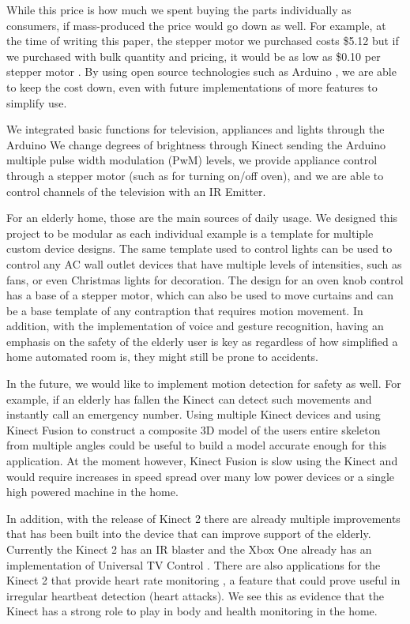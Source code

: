 \documentclass{chi-ext}
\begin{document}
While this price is how much we spent buying the parts individually as consumers, if mass-produced the price would go down as well.
For example, at the time of writing this paper, the stepper motor we purchased costs \$5.12 but if we purchased with bulk quantity and pricing, it would be as low as \$0.10 per stepper motor \cite{_stepper_motor}.
By using open source technologies such as Arduino \cite{_arduino_policy}, we are able to keep the cost down, even with future implementations of more features to simplify use.
 
We integrated basic functions for television, appliances and lights through the Arduino
We change degrees of brightness through Kinect sending the Arduino multiple pulse width modulation (PwM) levels, we provide appliance control through a stepper motor (such as for turning on/off oven), and we are able to control channels of the television with an IR Emitter.

For an elderly home, those are the main sources of daily usage. We designed this project to be modular as each individual example is a template for multiple custom device designs.
The same template used to control lights can be used to control any AC wall outlet devices that have multiple levels of intensities, such as fans, or even Christmas lights for decoration.
The design for an oven knob control has a base of a stepper motor, which can also be used to move curtains and can be a base template of any contraption that requires motion movement.
In addition, with the implementation of voice and gesture recognition, having an emphasis on the safety of the elderly user is key as regardless of how simplified a home automated room is, they might still be prone to accidents. 

In the future, we would like to implement motion detection for safety as well.
For example, if an elderly has fallen the Kinect can detect such movements and instantly call an emergency number.
Using multiple Kinect devices and using Kinect Fusion \cite{_kinect_fusion} to construct a composite 3D model of the users entire skeleton from multiple angles could be useful to build a model accurate enough for this application.
At the moment however, Kinect Fusion is slow using the Kinect and would require increases in speed spread over many low power devices or a single high powered machine in the home. 

In addition, with the release of Kinect 2 there are already multiple improvements that has been built into the device that can improve support of the elderly.
Currently the Kinect 2 has an IR blaster and the Xbox One already has an implementation of Universal TV Control \cite{_control_tv}.
There are also applications for the Kinect 2 that provide heart rate monitoring \cite{_xbox_fitness}, a feature that could prove useful in irregular heartbeat detection (heart attacks).
We see this as evidence that the Kinect has a strong role to play in body and health monitoring in the home.
\end{document}

